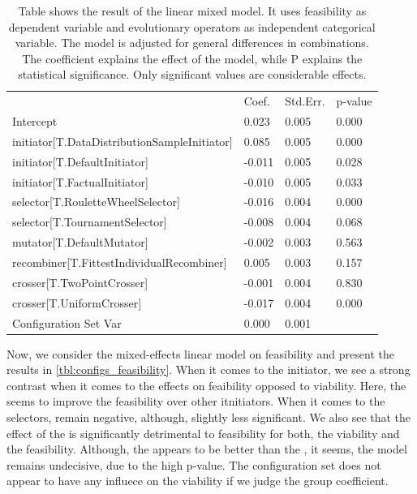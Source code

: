 \documentclass[./../../paper.tex]{subfiles}
\begin{document}
\begin{table}
    \caption{Table shows the result of the linear mixed model. It uses feasibility as dependent variable and evolutionary operators as independent categorical variable. The model is adjusted for general differences in combinations. The coefficient explains the effect of the model, while P explains the statistical significance. Only significant values are considerable effects.}
    \label{tbl:configs_feasibility}
    \begin{tabular}{llll}
                                                     & Coef.  & Std.Err. & p-value \\
        Intercept                                    & 0.023  & 0.005    & 0.000   \\
        initiator[T.DataDistributionSampleInitiator] & 0.085  & 0.005    & 0.000   \\
        initiator[T.DefaultInitiator]                & -0.011 & 0.005    & 0.028   \\
        initiator[T.FactualInitiator]                & -0.010 & 0.005    & 0.033   \\
        selector[T.RouletteWheelSelector]            & -0.016 & 0.004    & 0.000   \\
        selector[T.TournamentSelector]               & -0.008 & 0.004    & 0.068   \\
        mutator[T.DefaultMutator]                    & -0.002 & 0.003    & 0.563   \\
        recombiner[T.FittestIndividualRecombiner]    & 0.005  & 0.003    & 0.157   \\
        crosser[T.TwoPointCrosser]                   & -0.001 & 0.004    & 0.830   \\
        crosser[T.UniformCrosser]                    & -0.017 & 0.004    & 0.000   \\
        Configuration Set Var                        & 0.000  & 0.001    &         \\
    \end{tabular}
\end{table}

 Now, we consider the mixed-effects linear model on feasibility and present the results in \autoref{tbl:configs_feasibility}. When it comes to the initiator, we see a strong contrast when it comes to the effects on feaibility opposed to viability. Here, the  seems to improve the feasibility over other itnitiators. When it comes to the selectors,  remain negative, although, slightly less significant. We also see that the effect of the  is significantly detrimental to feasibility for both, the viability and the feasibility. Although, the  appears to be better than the , it seems, the model remains undecisive, due to the high p-value. The configuration set does not appear to have any influece on the viability if we judge the group coefficient.
\end{document}
